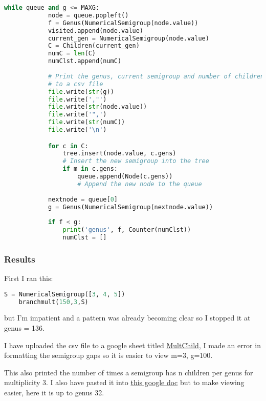 \begin{lstlisting}[language=python]
        while queue and g <= MAXG:
            node = queue.popleft()
            f = Genus(NumericalSemigroup(node.value))
            visited.append(node.value)
            current_gen = NumericalSemigroup(node.value)
            C = Children(current_gen)
            numC = len(C)
            numClst.append(numC)
            
            # Print the genus, current semigroup and number of children  
            # to a csv file 
            file.write(str(g))
            file.write(',"')
            file.write(str(node.value))
            file.write('",')
            file.write(str(numC))
            file.write('\n')

            for c in C:  
                tree.insert(node.value, c.gens)  
                # Insert the new semigroup into the tree
                if m in c.gens:
                    queue.append(Node(c.gens))  
                    # Append the new node to the queue
            
            nextnode = queue[0]
            g = Genus(NumericalSemigroup(nextnode.value))
            
            if f < g: 
                print('genus', f, Counter(numClst))
                numClst = []
\end{lstlisting}

\subsubsection*{Results}
First I ran this:
\begin{lstlisting}[language=python]
    S = NumericalSemigroup([3, 4, 5])
    branchmult(150,3,S)
\end{lstlisting}
but I'm impatient and a pattern was already becoming clear so I stopped it at genus = 136. 

I have uploaded the csv file to a google sheet titled \href{https://docs.google.com/spreadsheets/d/1xaydWKcqVwpPp5F2e6hJjlvRE8n7Usz3lbObVt-hW9E/edit?usp=sharing}{MultChild}, I made an error in formatting the semigroup gaps so it is easier to view m=3, g=100. 

This also printed the number of times a semigroup has n children per genus for multiplicity 3. I also have pasted it into \href{https://docs.google.com/document/d/1cEPls2GodRP2_9fGsHNTLlVaDbv5GTP3PEub-oqsaGY/edit?usp=sharing}{this google doc} but to make viewing easier, here it is up to genus 32. 

